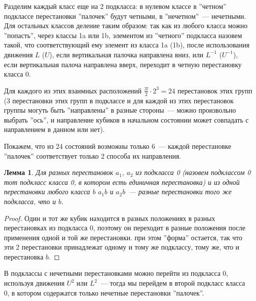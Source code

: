 \documentclass[utf8,a4paper,draft]{article}
\newtheorem{lemma_cub}{Лемма}
\begin{document}
Разделим каждый класс еще на 2 подкласса: в нулевом классе в ''четном'' подклассе перестановки ''палочек''  будут четными, в ''нечетном''~--- нечетными. Для остальных классов деление таким образом: так как из любого класса можно ''попасть'', через классы 1a или 1b, элементом из ''четного'' подкласса назовем такой, что соответствующий ему элемент из класса 1a (1b), после использования движения $L$ ($U$), если вертикальная палочка направлена вниз, или $L^{-1}$ ($U^{-1}$), если вертикальная палоча направлена вверх, переходит в четную перестановку класса 0.

Для каждого из этих взаимных расположений $\frac{3!}{2}\cdot 2^3=24$ перестановок этих групп (3 перестановки этих групп в подклассе и для каждой из этих перестановок группы могуть быть ''направлены'' в разные стороны~--- можно произвольно выбрать ''ось'', и направление кубиков в начальном состоянии может совпадать с направлением в данном или нет).

Покажем, что из 24 состояний возможны только 6~--- каждой перестановке ''палочек'' соответствует только 2 способа их направления.
\begin{lemma_cub}
Для разных перестановок $a_1$, $a_2$ из подкласса 0 (назовем подклассом 0 тот подкласс класса 0, в котором есть единичная перестановка) и из одной перестановки любого класса $b$ $a_1b$ и $a_2b$~--- разные перестановки того же подкласса, что и $b$.\label{lemma_classes}
\end{lemma_cub}
\begin{proof}
Один и тот же кубик находится в разных положениях в разных перестановках из подкласса 0, поэтому он переходит в разные положения после применения одной и той же перестановки. при этом ''форма'' остается, так что эти 2 перестановки принадлежат одному и тому же подклассу, тому же, что и перестановка $b$.
\end{proof}
В подклассы с нечетными перестановками можно перейти из подкласса 0, используя движения $U^2$ или $L^2$~--- тогда мы перейдем в второй подкласс класса 0, в котором содержатся только нечетные перестановки ''палочек''.
\end{document}
